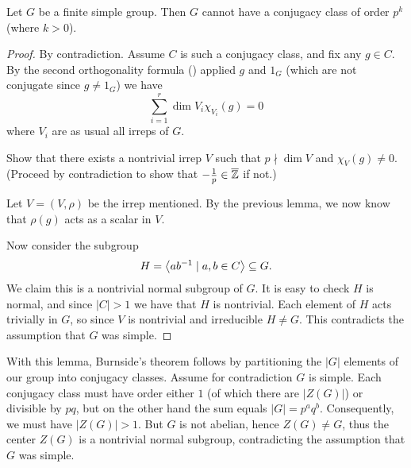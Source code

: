 \begin{lemma}
	Let $G$ be a finite simple group.
	Then $G$ cannot have a conjugacy class of order $p^k$ (where $k > 0$).
\end{lemma}
\begin{proof}
	By contradiction.
	Assume $C$ is such a conjugacy class, and fix any $g \in C$.
	By the second orthogonality formula ()
	applied $g$ and $1_G$ (which are not conjugate since $g \neq 1_G$) we have
	\[ \sum_{i=1}^r \dim V_i \chi_{V_i}(g) = 0 \]
	where $V_i$ are as usual all irreps of $G$.
	\begin{exercise}
		Show that there exists a nontrivial irrep $V$
		such that $p \nmid \dim V$ and $\chi_V(g) \neq 0$.
		(Proceed by contradiction to show that $-\frac1p \in \overline{\mathbb Z}$ if not.)
	\end{exercise}
	Let $V = (V, \rho)$ be the irrep mentioned.
	By the previous lemma, we now know that $\rho(g)$ acts as a scalar in $V$.

	Now consider the subgroup
	\[ H = \left< ab^{-1} \mid a,b \in C \right> \subseteq G. \]
	We claim this is a nontrivial normal subgroup of $G$.
	It is easy to check $H$ is normal,
	and since $|C| > 1$ we have that $H$ is nontrivial.
	Each element of $H$ acts trivially in $G$,
	so since $V$ is nontrivial and irreducible $H \neq G$.
	This contradicts the assumption that $G$ was simple.
\end{proof}

With this lemma, Burnside's theorem follows by partitioning
the $|G|$ elements of our group into conjugacy classes.
Assume for contradiction $G$ is simple.
Each conjugacy class must have order either $1$ (of which there are $|Z(G)|$)
or divisible by $pq$, but on the other hand the sum equals $|G| = p^aq^b$.
Consequently, we must have $|Z(G)| > 1$.
But $G$ is not abelian, hence $Z(G) \neq G$,
thus the center $Z(G)$ is a nontrivial normal subgroup,
contradicting the assumption that $G$ was simple.



